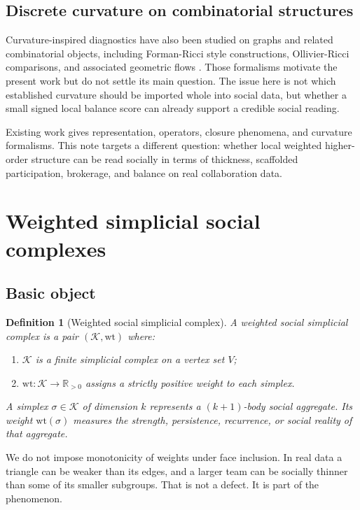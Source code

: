 \documentclass[11pt]{article}
\newtheorem{definition}{Definition}[section]
\newcommand{\R}{\mathbb{R}}
\newcommand{\K}{\mathcal{K}}
\newcommand{\wt}{\mathrm{wt}}
\begin{document}
\subsection*{Discrete curvature on combinatorial structures}

Curvature-inspired diagnostics have also been studied on graphs and related combinatorial objects, including Forman-Ricci style constructions, Ollivier-Ricci comparisons, and associated geometric flows \cite{WeberSaucanJost2017,SreejithMohapatraJostSaucanSamal2016}. Those formalisms motivate the present work but do not settle its main question. The issue here is not which established curvature should be imported whole into social data, but whether a small signed local balance score can already support a credible social reading.

Existing work gives representation, operators, closure phenomena, and curvature formalisms. This note targets a different question: whether local weighted higher-order structure can be read socially in terms of thickness, scaffolded participation, brokerage, and balance on real collaboration data.

\section{Weighted simplicial social complexes}

\subsection{Basic object}

\begin{definition}[Weighted social simplicial complex]
A weighted social simplicial complex is a pair $(\K,\wt)$ where:
\begin{enumerate}[label=(\alph*)]
    \item $\K$ is a finite simplicial complex on a vertex set $V$;
    \item $\wt:\K\to \R_{>0}$ assigns a strictly positive weight to each simplex.
\end{enumerate}
A simplex $\sigma \in \K$ of dimension $k$ represents a $(k+1)$-body social aggregate. Its weight $\wt(\sigma)$ measures the strength, persistence, recurrence, or social reality of that aggregate.
\end{definition}

We do not impose monotonicity of weights under face inclusion. In real data a triangle can be weaker than its edges, and a larger team can be socially thinner than some of its smaller subgroups. That is not a defect. It is part of the phenomenon.
\end{document}

